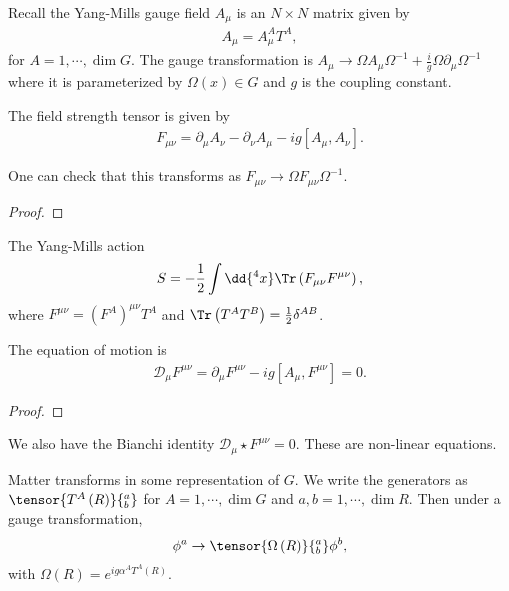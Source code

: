 
Recall the Yang-Mills gauge field $A_{\mu}$ is an $N \times  N$ matrix given by
\begin{align}
    A_{\mu} = A_{\mu}^{A} T^{A}
,\end{align}
for $A = 1, \cdots, \dim G$. The gauge transformation is $A_\mu \to \Omega A_\mu \Omega^{-1} + \frac{i}{g} \Omega \partial_\mu \Omega^{-1}$ where it is parameterized by $\Omega \left( x \right) \in G$ and $g$ is the coupling constant.

The field strength tensor is given by
\begin{align}
    F_{\mu \nu} = \partial_\mu A_\nu - \partial_\nu A_\mu - ig \left[ A_\mu, A_\nu \right] 
.\end{align}

One can check that this transforms as $F_{\mu \nu} \to \Omega F_{\mu \nu} \Omega^{-1}$.
\begin{proof}
    
\end{proof}

The Yang-Mills action
\begin{align}
    S = -\frac{1}{2} \int \dd{^{4}x} \Tr \left( F_{\mu \nu} F^{\mu \nu} \right) 
,\end{align}
where $F^{\mu \nu} = \left( F^{A} \right)^{\mu \nu} T^{A}$ and $\Tr \left( T^{A} T^{B} \right) = \frac{1}{2} \delta^{AB}$.

The equation of motion is
\begin{align}
    \mathcal{D}_\mu F^{\mu \nu} = \partial_\mu F^{\mu \nu} - ig \left[ A_\mu, F^{\mu \nu} \right] = 0
.\end{align}

\begin{proof}
    
\end{proof}

We also have the Bianchi identity $\mathcal{D}_\mu \star F^{\mu \nu} = 0$. These are non-linear equations.

Matter transforms in some representation of $G$. We write the generators as $\tensor{T^{A} \left( R \right)}{^{a}_b}$ for $A = 1, \cdots, \dim G$ and $a,b = 1, \cdots, \dim R$. Then under a gauge transformation,
\begin{align}
    \phi^{a} \to \tensor{\Omega \left( R \right)}{^{a}_b} \phi^{b}
,\end{align}
with $\Omega \left( R \right) = e^{i g \alpha^{A} T^{A}\left( R \right) }$.


